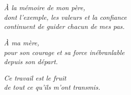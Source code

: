 \chapter*{}
\thispagestyle{empty}

\vspace*{\fill}

\begin{flushright}
\textit{À la mémoire de mon père,\\
dont l'exemple, les valeurs et la confiance\\
continuent de guider chacun de mes pas.}

\vspace{1.5em}

\textit{À ma mère,\\
pour son courage et sa force inébranlable\\
depuis son départ.}

\vspace{1.5em}

\textit{Ce travail est le fruit\\
de tout ce qu'ils m'ont transmis.}
\end{flushright}

\vspace*{\fill}
